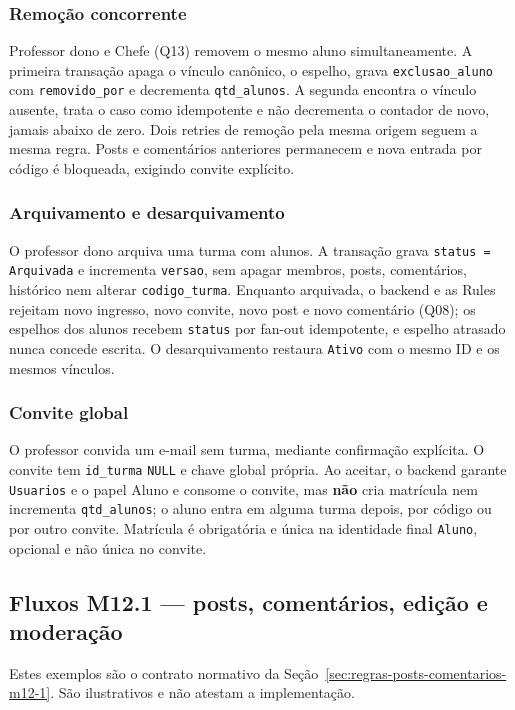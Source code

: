 \subsubsection{Remoção concorrente}
Professor dono e Chefe (Q13) removem o mesmo aluno simultaneamente. A primeira
transação apaga o vínculo canônico, o espelho, grava \texttt{exclusao\_aluno}
com \texttt{removido\_por} e decrementa \texttt{qtd\_alunos}. A segunda
encontra o vínculo ausente, trata o caso como idempotente e não decrementa o
contador de novo, jamais abaixo de zero. Dois retries de remoção pela mesma
origem seguem a mesma regra. Posts e comentários anteriores permanecem e nova
entrada por código é bloqueada, exigindo convite explícito.

\subsubsection{Arquivamento e desarquivamento}
O professor dono arquiva uma turma com alunos. A transação grava
\texttt{status = Arquivada} e incrementa \texttt{versao}, sem apagar membros,
posts, comentários, histórico nem alterar \texttt{codigo\_turma}. Enquanto
arquivada, o backend e as Rules rejeitam novo ingresso, novo convite, novo post
e novo comentário (Q08); os espelhos dos alunos recebem \texttt{status} por
fan-out idempotente, e espelho atrasado nunca concede escrita. O
desarquivamento restaura \texttt{Ativo} com o mesmo ID e os mesmos vínculos.

\subsubsection{Convite global}
O professor convida um e-mail sem turma, mediante confirmação explícita. O
convite tem \texttt{id\_turma} \texttt{NULL} e chave global própria. Ao aceitar,
o backend garante \texttt{Usuarios} e o papel Aluno e consome o convite, mas
\textbf{não} cria matrícula nem incrementa \texttt{qtd\_alunos}; o aluno entra
em alguma turma depois, por código ou por outro convite. Matrícula é
obrigatória e única na identidade final \texttt{Aluno}, opcional e não única no
convite.

\subsection{Fluxos M12.1 --- posts, comentários, edição e moderação}
Estes exemplos são o contrato normativo da
Seção~\ref{sec:regras-posts-comentarios-m12-1}. São ilustrativos e não atestam a
implementação.

